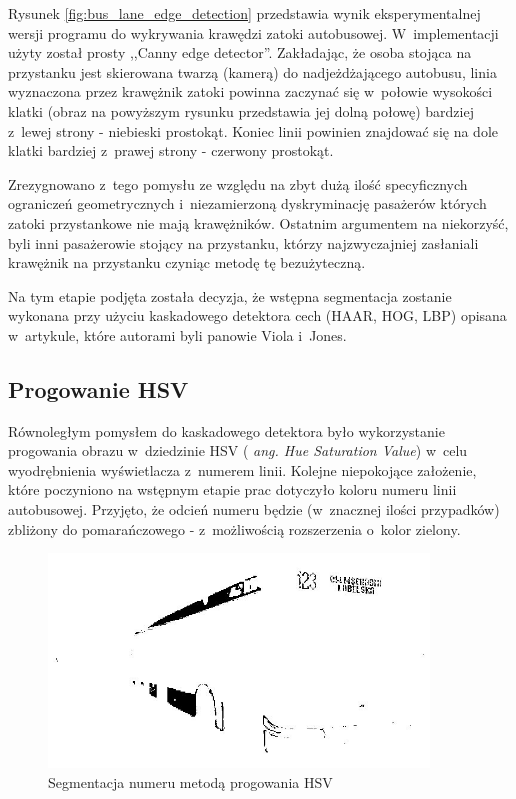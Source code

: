 Rysunek \ref{fig:bus_lane_edge_detection} przedstawia wynik 
eksperymentalnej wersji programu do
wykrywania krawędzi zatoki autobusowej. W~implementacji użyty
został prosty ,,Canny edge detector''. Zakładając, że osoba stojąca
na przystanku jest skierowana twarzą (kamerą) do nadjeżdżającego autobusu,
linia wyznaczona przez krawężnik zatoki powinna zaczynać się w~połowie
wysokości klatki (obraz na powyższym rysunku przedstawia jej dolną
połowę) bardziej z~lewej strony - niebieski prostokąt. Koniec linii
powinien znajdować się na dole klatki bardziej z~prawej strony - czerwony
prostokąt.

Zrezygnowano z~tego pomysłu ze względu na zbyt dużą ilość 
specyficznych
ograniczeń geometrycznych i~niezamierzoną dyskryminację pasażerów
których zatoki przystankowe nie mają krawężników. Ostatnim argumentem
na niekorzyść, 
byli inni pasażerowie stojący na przystanku, którzy najzwyczajniej
zasłaniali krawężnik na przystanku czyniąc metodę tę bezużyteczną.

Na tym etapie podjęta została decyzja, że wstępna segmentacja
zostanie wykonana przy użyciu kaskadowego detektora cech (HAAR, HOG, LBP)
opisana w~artykule, które autorami byli panowie Viola i~Jones.

\subsection{Progowanie HSV}

Równoległym pomysłem do kaskadowego detektora było 
wykorzystanie progowania obrazu w~dziedzinie HSV (\textit{
ang. Hue Saturation Value})
w~celu wyodrębnienia wyświetlacza z~numerem linii. 
Kolejne niepokojące założenie, które poczyniono
na wstępnym etapie prac dotyczyło koloru numeru linii autobusowej.
Przyjęto, że odcień numeru będzie (w~znacznej ilości przypadków) 
zbliżony do pomarańczowego - z~możliwością rozszerzenia o~kolor
zielony. 

\begin{figure}[h!]
    \centering
    \includegraphics[width=0.9\textwidth]{img/exp_hsv_threshold_number_detector}
    \caption{Segmentacja numeru metodą progowania HSV}
\end{figure}


